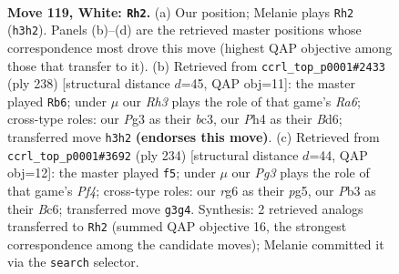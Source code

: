 \documentclass[11pt]{article}
\begin{document}
\clearpage

\begin{figure}[p]\centering
\begin{subfigure}{0.46\textwidth}\centering
\resizebox{\linewidth}{!}{%
\newchessgame
\chessboard[
  setfen={5k2/8/p5r1/P1p2p1p/1p3P1P/1P2PKPR/8/8 w - - 25 119},
  showmover=false,
  pgfstyle=straightmove, color=movearrow, markmove={h3-h2}
]}
\caption{}
\end{subfigure}\hfill
\begin{subfigure}{0.46\textwidth}\centering
\resizebox{\linewidth}{!}{%
\newchessgame
\chessboard[
  setfen={8/5k2/R2B2p1/3r1pPp/5P1P/2b2PK1/8/8 w - - 21 120},
  showmover=false,
  pgfstyle=straightmove, color=movearrow, markmove={a6-b6}
]}
\caption{}
\end{subfigure}
\\[4pt]
\begin{subfigure}{0.46\textwidth}\centering
\resizebox{\linewidth}{!}{%
\newchessgame
\chessboard[
  setfen={5k2/2n5/2Bp3p/p1p3p1/P1P2PP1/1P2R1K1/8/5r2 w - - 0 118},
  showmover=false,
  pgfstyle=straightmove, color=movearrow, markmove={f4-f5}
]}
\caption{}
\end{subfigure}\hfill

\caption{\textbf{Move 119, White: \texttt{Rh2}.} (a) Our position; Melanie plays \texttt{Rh2} (\texttt{h3h2}). Panels (b)--(d) are the retrieved master positions whose correspondence most drove this move (highest QAP objective among those that transfer to it). (b) Retrieved from \texttt{ccrl\_top\_p0001\#2433} (ply 238) [structural distance $d$=45, QAP obj=11]: the master played \texttt{Rb6}; under $\mu$ our \emph{Rh3} plays the role of that game's \emph{Ra6}; cross-type roles: our \emph{P}g3 as their \emph{b}c3, our \emph{P}h4 as their \emph{B}d6; transferred move \texttt{h3h2} \textbf{(endorses this move)}. (c) Retrieved from \texttt{ccrl\_top\_p0001\#3692} (ply 234) [structural distance $d$=44, QAP obj=12]: the master played \texttt{f5}; under $\mu$ our \emph{Pg3} plays the role of that game's \emph{Pf4}; cross-type roles: our \emph{r}g6 as their \emph{p}g5, our \emph{P}b3 as their \emph{B}c6; transferred move \texttt{g3g4}. Synthesis: 2 retrieved analogs transferred to \texttt{Rh2} (summed QAP objective 16, the strongest correspondence among the candidate moves); Melanie committed it via the \texttt{search} selector.}
\label{fig:thought-m236}
\end{figure}

\clearpage
\end{document}
